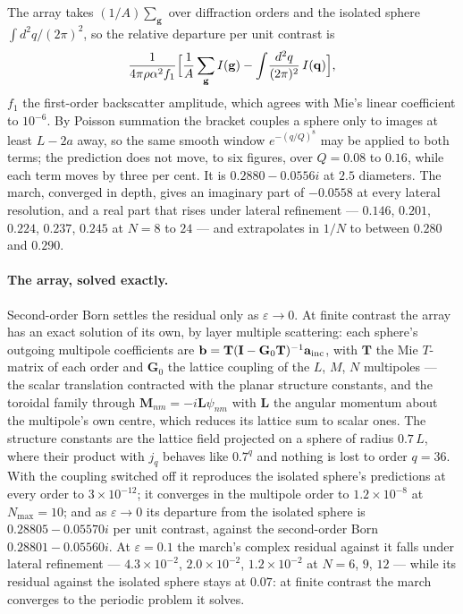 \documentclass[11pt,a4paper]{article}
\begin{document}
The array
takes $(1/A)\sum_{\mathbf{g}}$ over diffraction orders and the isolated sphere
$\int d^2q/(2\pi)^2$, so the relative departure per unit contrast is
\begin{equation}\label{eq:born2delta}
  \frac{1}{4\pi\rho\alpha^2 f_1}\Bigl[\frac{1}{A}\sum_{\mathbf{g}} I(\mathbf{g})
    - \int\!\frac{d^2q}{(2\pi)^2}\,I(\mathbf{q})\Bigr],
\end{equation}
$f_1$ the first-order backscatter amplitude, which agrees with Mie's linear
coefficient to $10^{-6}$.  By Poisson summation the bracket couples a sphere only
to images at least $L-2a$ away, so the same smooth window
$e^{-(q/Q)^8}$ may be applied to both terms; the prediction does not move, to
six figures, over $Q=0.08$ to $0.16$, while each term moves by three per cent.
It is $0.2880-0.0556i$ at $2.5$ diameters.  The march, converged in depth, gives
an imaginary part of $-0.0558$ at every lateral resolution, and a real part that
rises under lateral refinement --- $0.146$, $0.201$, $0.224$, $0.237$, $0.245$ at
$N=8$ to $24$ --- and extrapolates in $1/N$ to between $0.280$ and $0.290$.

\paragraph{The array, solved exactly.}  Second-order Born settles the
residual only as $\varepsilon\to0$.  At finite contrast the array has an exact
solution of its own, by layer multiple scattering: each sphere's outgoing
multipole coefficients are $\mathbf{b}=\mathbf{T}(\mathbf{I}-\mathbf{G}_0\mathbf{T})^{-1}
\mathbf{a}_{\rm inc}$, with $\mathbf{T}$ the Mie $T$-matrix of each order and
$\mathbf{G}_0$ the lattice coupling of the $L$, $M$, $N$ multipoles --- the scalar
translation contracted with the planar structure constants, and the toroidal
family through $\mathbf{M}_{nm}=-i\mathbf{L}\psi_{nm}$ with $\mathbf{L}$ the angular
momentum about the multipole's own centre, which reduces its lattice sum to
scalar ones.  The structure constants are the lattice field projected on a
sphere of radius $0.7\,L$, where their product with $j_q$ behaves like
$0.7^q$ and nothing is lost to order $q=36$.  With the coupling switched off it
reproduces the isolated sphere's predictions at every order to $3\times10^{-12}$;
it converges in the multipole order to $1.2\times10^{-8}$ at $N_{\max}=10$; and
as $\varepsilon\to0$ its departure from the isolated sphere is
$0.28805-0.05570i$ per unit contrast, against the second-order Born
$0.28801-0.05560i$.  At $\varepsilon=0.1$ the march's complex residual against
it falls under lateral refinement --- $4.3\times10^{-2}$, $2.0\times10^{-2}$,
$1.2\times10^{-2}$ at $N=6$, $9$, $12$ --- while its residual against the
isolated sphere stays at $0.07$: at finite contrast the march converges to the
periodic problem it solves.
\end{document}
